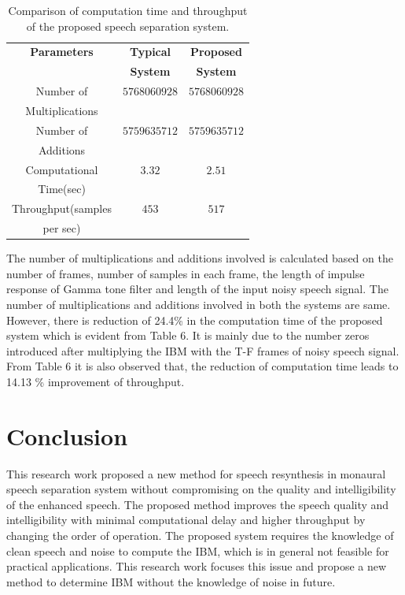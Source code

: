 \documentclass[a4paper]{article}
\begin{document}
\begin{table}[th]
  \caption{Comparison of computation time and throughput of the proposed speech separation system.}
  \label{tab:word_styles}
  \centering
  \begin{tabular}{|c|c|c|}
    \hline
    \textbf{Parameters}        & \textbf{Typical}                            & \textbf{Proposed}\\
															 & \textbf{System} 													   & \textbf{System}\\
    \hline
    Number of                  & $5768060928$                                & $5768060928$    \\
		Multiplications						 &																						 &				\\
		\hline
    Number of                  & $5759635712$                                & $5759635712$  \\
		Additions									 &																						 &        \\
		\hline
    Computational              & $3.32$                                      & $2.51$ \\
		Time(sec)									 &																						 &        \\
		\hline
		Throughput(samples				 &  $453$																			 & $517$   \\
		per sec)	  					     &  																					 &         \\
		\hline
  \end{tabular}
\end{table}


The number of multiplications and additions involved is calculated based on the number of frames, number of samples in each frame, the length of impulse response of Gamma tone filter and length of the input noisy speech signal. The number of multiplications and additions involved in both the systems are same. However, there is reduction of 24.4\% in the computation time of the proposed system which is evident from Table 6. It is mainly due to the number zeros introduced after multiplying the IBM with the T-F frames of noisy speech signal.  From Table 6 it is also observed that, the reduction of computation time leads to 14.13 \% improvement of throughput.
\section{Conclusion}
This research work proposed a new method for speech resynthesis in monaural speech separation system without compromising on the quality and intelligibility of the enhanced speech. The proposed method improves the speech quality and intelligibility with minimal computational delay and higher throughput by changing the order of operation. The proposed system requires the knowledge of clean speech and noise to compute the IBM, which is in general not feasible for practical applications. This research work focuses this issue and propose a new method to determine IBM without the knowledge of noise in future.
\end{document}
